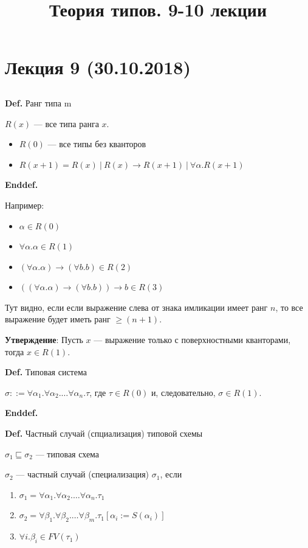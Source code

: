 \documentclass[12pt]{article}
\title{Теория типов. 9-10 лекции}
\begin{document}
\section{Лекция 9 (30.10.2018)}

\subsection{}

\noindent\textbf{Def.} Ранг типа  m 

$R(x)$ --- все типа ранга $x$.
\begin{itemize}
    \item $R(0)$ --- все типы без кванторов
    \item $R(x + 1) = R(x)\ |\ R(x) \rightarrow R(x + 1)\ |\ \forall \alpha.R(x + 1)$
\end{itemize}
\noindent\textbf{Enddef.} 

Например:
\begin{paracol}{2}
\begin{itemize}
    \item $\alpha \in R(0)$
    \item $\forall \alpha.\alpha \in R(1)$
    \item $(\forall \alpha.\alpha) \rightarrow (\forall b.b) \in R(2)$ 
    \item $((\forall \alpha.\alpha) \rightarrow (\forall b.b)) \rightarrow b \in R(3)$
\end{itemize}
\switchcolumn
Тут видно, если если выражение слева от знака имликации имеет ранг $n$, то все выражение будет иметь ранг $\geq (n + 1)$.
\end{paracol}

\textbf{Утверждение}: Пусть $x$ --- выражение только с поверхностными кванторами, тогда $x \in R(1)$. 

\noindent\textbf{Def.} Типовая система

$\sigma ::= \forall \alpha_1. \forall \alpha_2. \dots \forall \alpha_n. \tau$, где $\tau \in R(0)$ и, следовательно, $\sigma \in R(1)$.

\noindent\textbf{Enddef.} 

\noindent\textbf{Def.} Частный случай (спциализация) типовой схемы

$\sigma_1 \sqsubseteq \sigma_2$ --- типовая схема

$\sigma_2$ --- частный случай (специализация) $\sigma_1$, если 

\begin{enumerate}
    \item $\sigma_1 =  \forall \alpha_1. \forall \alpha_2. \dots \forall \alpha_n. \tau_1$
    \item $\sigma_2 =  \forall \beta_1. \forall \beta_2. \dots \forall \beta_m. \tau_1[\alpha_i := S(\alpha_i)]$
    \item $\forall i. \beta_i \in FV(\tau_1)$
\end{enumerate}
\end{document}
